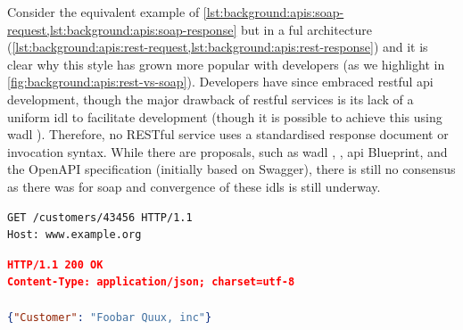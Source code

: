 \noindent
Consider the equivalent example of \cref{lst:background:apis:soap-request,lst:background:apis:soap-response} but in a ful architecture (\cref{lst:background:apis:rest-request,lst:background:apis:rest-response}) and it is clear why this style has grown more popular with developers (as we highlight in \cref{fig:background:apis:rest-vs-soap}). Developers have since embraced \gls{rest}ful \gls{api} development, though the major drawback of \gls{rest}ful services is its lack of a uniform \gls{idl} to facilitate development (though it is possible to achieve this using \gls{wadl} ).  Therefore, no RESTful service uses a standardised response document or invocation syntax. While there are proposals, such as \gls{wadl} \citep{Hadley:2006vv}, , \gls{api} Blueprint, and the OpenAPI specification (initially based on Swagger), there is still no consensus as there was for \gls{soap} and convergence of these \glspl{idl} is still underway.

\begin{samepage}
\begin{lstlisting}[label=lst:background:apis:rest-request,caption={[An example RESTful request]An equivalent \glsac{http} consumer request to that of \cref{lst:background:apis:soap-request}, but using \gls{rest}. Source: \citepweb{Ballinger:2014aa}.}]
GET /customers/43456 HTTP/1.1
Host: www.example.org
\end{lstlisting}
\begin{lstlisting}[language=json,label=lst:background:apis:rest-response,caption={[An example RESTful response]The \gls{rest} \glsac{http} service provider response for \cref{lst:background:apis:rest-request}. Source: \citepweb{Ballinger:2014aa}.}]
HTTP/1.1 200 OK
Content-Type: application/json; charset=utf-8

{"Customer": "Foobar Quux, inc"}
\end{lstlisting}
\end{samepage}

